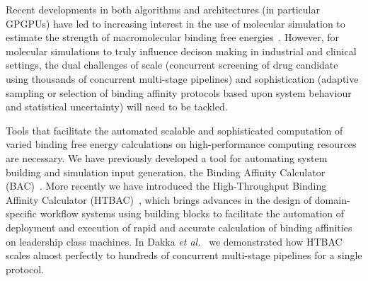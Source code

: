 Recent developments in both algorithms and architectures (in particular
GPGPUs) have led to increasing interest in the use of molecular simulation to
estimate the strength of macromolecular binding free
energies~\cite{DeVivo2016}. However, for molecular simulations to truly
influence decison making in industrial and clinical settings, the dual
challenges of scale (concurrent screening of drug candidate using thousands of
concurrent multi-stage pipelines) and sophistication (adaptive sampling or
selection of binding affinity protocols based upon system behaviour and
statistical uncertainty) will need to be tackled.


Tools that facilitate the automated scalable and sophisticated computation of
varied binding free energy calculations on high-performance computing
resources are necessary. We have previously developed a tool for automating
system building and simulation input generation, the Binding Affinity
Calculator (BAC)~\cite{Sadiq2008}. More recently we have introduced the High-Throughput Binding Affinity Calculator (HTBAC)~\cite{dakka2017}, which brings
advances in the design of domain-specific workflow systems using building
blocks to facilitate the automation of deployment and execution of rapid and
accurate calculation of binding affinities on leadership class machines. In
Dakka \textit{et al.}~\cite{dakka2017} we demonstrated how HTBAC scales almost
perfectly to hundreds of concurrent multi-stage pipelines for a single
protocol.


